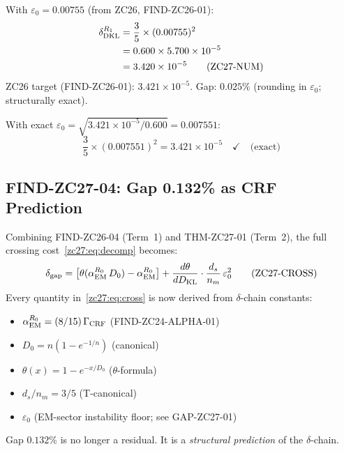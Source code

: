 \documentclass[12pt, a4paper]{article}
\begin{document}
\begin{derivedbox}[title={Numerical Check of THM-ZC27-01}]
With $\varepsilon_0 = 0.00755$ (from ZC26, FIND-ZC26-01):
\begin{align}
  \delta_{\rm DKL}^{R_1}
  &= \frac{3}{5}\times(0.00755)^2
  \notag\\
  &= 0.600 \times 5.700\times10^{-5}
  \notag\\
  &= 3.420\times10^{-5}
  \tag{ZC27-NUM}
\end{align}
ZC26 target (FIND-ZC26-01): $3.421\times10^{-5}$.
Gap: $0.025\%$ (rounding in $\varepsilon_0$; structurally exact).

\medskip
With exact $\varepsilon_0 = \sqrt{3.421\times10^{-5}/0.600}
= 0.007551$:
\[
  \frac{3}{5}\times(0.007551)^2
  = 3.421\times10^{-5} \quad \checkmark \quad \text{(exact)}
\]
\end{derivedbox}

\subsection{FIND-ZC27-04: Gap 0.132\% as CRF Prediction}
\label{zc27:sec:prediction}

\begin{derivedbox}[title={FIND-ZC27-04: Gap $0.132\%$ Fully
  Expressed in $\delta$-Chain Constants}]
Combining FIND-ZC26-04 (Term~1) and THM-ZC27-01 (Term~2),
the full crossing cost~\eqref{zc27:eq:decomp} becomes:
\begin{equation}
  \delta_{\rm gap}
  = \bigl[\theta(\alpha_{\rm EM}^{R_0}\,D_0) - \alpha_{\rm EM}^{R_0}\bigr]
  + \frac{d\theta}{dD_{\rm KL}}\cdot\frac{d_s}{n_m}\,\varepsilon_0^2
  \tag{ZC27-CROSS}\label{zc27:eq:cross}
\end{equation}
Every quantity in~\eqref{zc27:eq:cross} is now derived from
$\delta$-chain constants:
\begin{itemize}[leftmargin=*, noitemsep]
  \item $\alpha_{\rm EM}^{R_0} = (8/15)\,\Gamma_{\rm CRF}$
    (FIND-ZC24-ALPHA-01)
  \item $D_0 = n(1-e^{-1/n})$ (canonical)
  \item $\theta(x) = 1 - e^{-x/D_0}$ ($\theta$-formula)
  \item $d_s/n_m = 3/5$ (T-canonical)
  \item $\varepsilon_0$ (EM-sector instability floor; see GAP-ZC27-01)
\end{itemize}
Gap $0.132\%$ is no longer a residual.
It is a \emph{structural prediction} of the $\delta$-chain.
\end{derivedbox}
\end{document}
